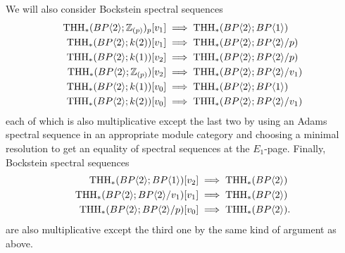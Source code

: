We will also consider Bockstein spectral sequences 
\begin{align}
	\label{v_0v_1BSS}\THH_*(\B;\Z_{(p)})_p[v_1]&\implies \THH_*(\B;\tBP{1})\\
	\label{v_2v_1BSS}\THH_*(\B;k(2))[v_1]&\implies \THH_*(\B;\B/p)\\
	\label{v_1v_2BSS}\THH_*(\B;k(1))[v_2]&\implies \THH_*(\B;\B/p)\\
	\label{v_0v_2BSS}\THH_*(\B;\Z_{(p)})[v_2]&\implies \THH_*(\B;\B/v_1)\\
	\label{v_1v_0BSS}\THH_*(\B;k(1))[v_0]&\implies \THH_*(\B;\tBP{1})\\
	\label{v_2v_0BSS}\THH_*(\B;k(2))[v_0]&\implies \THH_*(\B;\B/v_1)
\end{align}
each of which is also multiplicative except the last two by using an Adams spectral sequence in an appropriate module category and choosing a minimal resolution to get an equality of spectral sequences at the $E_1$-page. 
Finally, Bockstein spectral sequences 
\begin{align}
	\label{v_0v_1v_2BSS}\THH_*(\B;\tBP{1})[v_2]&\implies \THH_*(\B)\\
	\label{v_0v_2v_1BSS}\THH_*(\B;\B/v_1)[v_1]&\implies \THH_*(\B)\\
	\label{v_1v_2v_0BSS}\THH_*(\B;\B/p)[v_0]&\implies \THH_*(\B).
\end{align}
are also multiplicative except the third one by the same kind of argument as above. 
